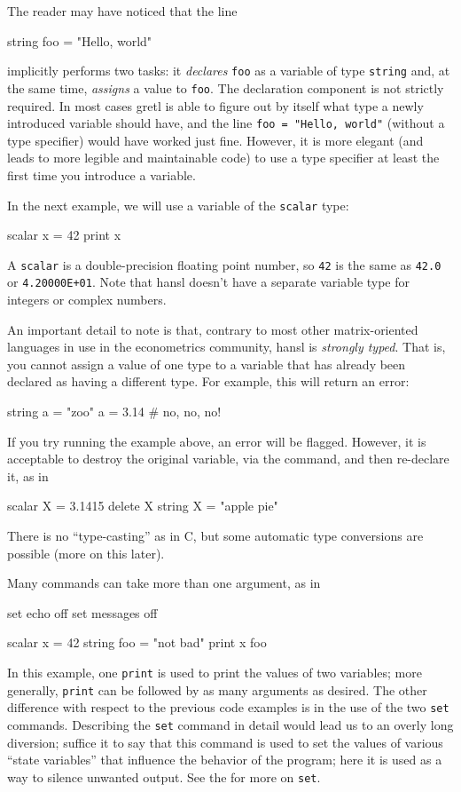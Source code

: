 The reader may have noticed that the line 
\begin{code}
  string foo = "Hello, world"
\end{code}
implicitly performs two tasks: it \emph{declares} \texttt{foo} as a
variable of type \texttt{string} and, at the same time, \emph{assigns}
a value to \texttt{foo}. The declaration component is not strictly
required. In most cases gretl is able to figure out by itself what
type a newly introduced variable should have, and the line
\verb|foo = "Hello, world"| (without a type specifier) would have
worked just fine.  However, it is more elegant (and leads to more
legible and maintainable code) to use a type specifier at least the
first time you introduce a variable.
  
In the next example, we will use a variable of the \texttt{scalar}
type:
\begin{code}
  scalar x = 42
  print x
\end{code}
A \texttt{scalar} is a double-precision floating point number, so
\texttt{42} is the same as \texttt{42.0} or \texttt{4.20000E+01}. Note
that hansl doesn't have a separate variable type for integers or
complex numbers.

An important detail to note is that, contrary to most other
matrix-oriented languages in use in the econometrics community, hansl
is \emph{strongly typed}. That is, you cannot assign a value of one
type to a variable that has already been declared as having a
different type. For example, this will return an error:
\begin{code}
  string a = "zoo"
  a = 3.14 # no, no, no!
\end{code}
If you try running the example above, an error will be
flagged. However, it is acceptable to destroy the original variable,
via the  command, and then re-declare it, as in
\begin{code}
  scalar X = 3.1415
  delete X
  string X = "apple pie"
\end{code}

There is no ``type-casting'' as in C, but some automatic type
conversions are possible (more on this later).

Many commands can take more than one argument, as in
\begin{code}
  set echo off
  set messages off

  scalar x = 42
  string foo = "not bad"
  print x foo 
\end{code}
In this example, one \texttt{print} is used to print the values of two
variables; more generally, \texttt{print} can be followed by as many
arguments as desired. The other difference with respect to the
previous code examples is in the use of the two \texttt{set}
commands. Describing the \texttt{set} command in detail would lead us
to an overly long diversion; suffice it to say that this command is
used to set the values of various ``state variables'' that influence
the behavior of the program; here it is used as a way to silence
unwanted output. See the \GCR{} for more on \texttt{set}.

